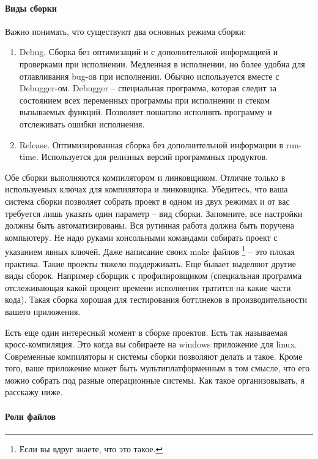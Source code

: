 \paragraph{Виды сборки}

Важно понимать, что существуют два основных режима сборки:
\begin{enumerate}
\item Debug.
Сборка без оптимизаций и с дополнительной информацией и проверками при исполнении.
Медленная в исполнении, но более удобна для отлавливания bug-ов при исполнении.
Обычно используется вместе с Debugger-ом.
Debugger -- специальная программа, которая следит за состоянием всех переменных программы при исполнении и стеком вызываемых функций.
Позволяет пошагово исполнять программу и отслеживать ошибки исполнения.

\item Release.
Оптимизированная сборка без дополнительной информации в run-time.
Используется для релизных версий программных продуктов.
\end{enumerate}
Обе сборки выполняются компилятором и линковщиком.
Отличие только в используемых ключах для компилятора и линковщика.
Убедитесь, что ваша система сборки позволяет собрать проект в одном из двух режимах и от вас требуется лишь указать один параметр -- вид сборки.
Запомните, все настройки должны быть автоматизированы.
Вся рутинная работа должна быть поручена компьютеру.
Не надо руками консольными командами собирать проект с указанием явных ключей.
Даже написание своих make файлов%
\footnote{Если вы вдруг знаете, что это такое.}
-- это плохая практика.
Такие проекты тяжело поддерживать.
Еще бывает выделяют другие виды сборок.
Например сборщик с профилировщиком (специальная программа отслеживающая какой процент времени исполнения тратится на какие части кода).
Такая сборка хорошая для тестирования боттлнеков в производительности вашего приложения.

Есть еще один интересный момент в сборке проектов.
Есть так называемая кросс-компиляция.
Это когда вы собираете на windows приложение для linux.
Современные компиляторы и системы сборки позволяют делать и такое.
Кроме того, ваше приложение может быть мультиплатформенным в том смысле, что его можно собрать под разные операционные системы.
Как такое организовывать, я расскажу ниже.

\paragraph{Роли файлов}

